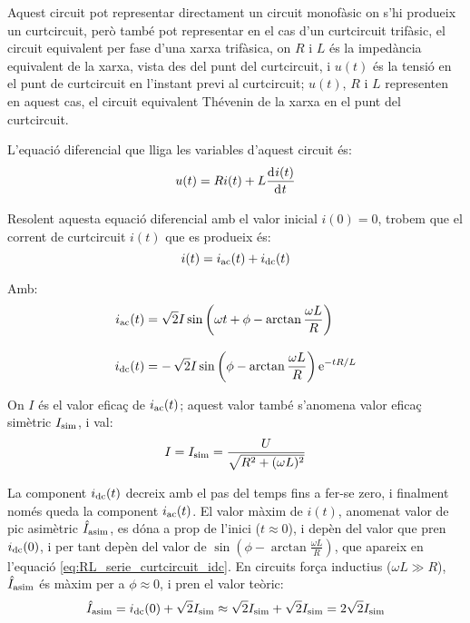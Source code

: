 Aquest circuit pot representar directament un circuit monofàsic on s'hi produeix un curtcircuit, però també pot representar en el cas d'un curtcircuit trifàsic,  el circuit equivalent per fase d'una xarxa trifàsica, on $R$ i $L$ és la impedància equivalent de la xarxa, vista des del punt del curtcircuit, i $u(t)$ és la tensió en el punt de curtcircuit en l'instant previ al curtcircuit; $u(t)$,  $R$ i $L$ representen en aquest cas, el circuit equivalent Thévenin de la xarxa en el punt del curtcircuit.

\begin{center}
    
    \label{pic:RL_serie_curtcircuit}
\end{center}

L'equació diferencial que lliga les variables d'aquest circuit és:
\begin{equation}
    u(t) = R i(t) + L \deriv{i(t)}{t}
\end{equation}

Resolent aquesta equació diferencial amb el valor inicial $i(0)=0$, trobem que el corrent de curtcircuit $i(t)$  que es produeix  és:
\begin{equation}
    i(t) = i_\mathrm{ac}(t) + i_\mathrm{dc}(t)
    \label{eq:RL_serie_curtcircuit_icc}
\end{equation}

Amb:
\begin{subequations}
\begin{align}
    i_\mathrm{ac}(t) &= \sqrt{2} I \sin\left(\omega t + \phi - \arctan\frac{\omega L}{R}\right) \label{eq:RL_serie_curtcircuit_iac}\\[3mm]
    i_\mathrm{dc}(t) &= -\,\sqrt{2} I\sin\left(\phi - \arctan\frac{\omega L}{R}\right) \mathrm{e}^{-t R/L}\label{eq:RL_serie_curtcircuit_idc}
\end{align}
\end{subequations}

On $I$ és el valor eficaç de $i_\mathrm{ac}(t)$; aquest valor també s'anomena valor eficaç simètric $I_\mathrm{sim}$, i val:
\begin{equation}
    I = I_\mathrm{sim} =\frac{U}{\sqrt{R^2+(\omega L)^2}}
    \label{eq:RL_serie_curtcircuit_I}
\end{equation}

La component $i_\mathrm{dc}(t)$ decreix amb el pas del temps fins a fer-se zero, i finalment només queda la component $i_\mathrm{ac}(t)$. El valor màxim de $i(t)$, anomenat valor de pic asimètric $\hat{I}_\mathrm{asim}$, es dóna a prop de l'inici ($t\approx 0$), i depèn del valor que pren $i_\mathrm{dc}(0)$, i per tant depèn del valor de $\sin\left(\phi - \arctan\frac{\omega L}{R}\right)$, que apareix en l'equació \eqref{eq:RL_serie_curtcircuit_idc}. En circuits força inductius ($\omega L\gg R$), $\hat{I}_\mathrm{asim}$ és màxim per a $\phi \approx 0$, i pren el valor teòric:
\begin{equation}
    \hat{I}_\mathrm{asim} = i_\mathrm{dc}(0) + \sqrt{2} I_\mathrm{sim} \approx \sqrt{2} I_\mathrm{sim} +\sqrt{2} I_\mathrm{sim} =2 \sqrt{2} I_\mathrm{sim}    \label{eq:I_asim_pic}
\end{equation}



